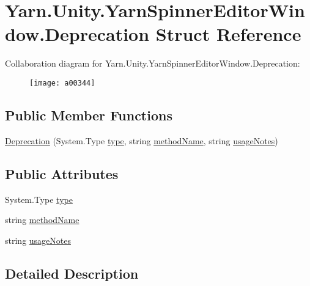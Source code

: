 \hypertarget{a00034}{\section{Yarn.\-Unity.\-Yarn\-Spinner\-Editor\-Window.\-Deprecation Struct Reference}
\label{a00034}
}


Collaboration diagram for Yarn.\-Unity.\-Yarn\-Spinner\-Editor\-Window.\-Deprecation\-:
\nopagebreak
\begin{figure}[H]
\begin{center}
\leavevmode
\texttt{[image: a00344]}
\end{center}
\end{figure}
\subsection*{Public Member Functions}
\begin{DoxyCompactItemize}
\item 
\hyperlink{a00034_ae80171841e97a48611c51a9a574a2fc0}{Deprecation} (System.\-Type \hyperlink{a00034_a750904df254223bf3131c39017f90a0b}{type}, string \hyperlink{a00034_a61605b2d0a17dfdf9c62952270d44fbd}{method\-Name}, string \hyperlink{a00034_ac23509be7ae6b43a3e2154dd430954a7}{usage\-Notes})
\end{DoxyCompactItemize}
\subsection*{Public Attributes}
\begin{DoxyCompactItemize}
\item 
System.\-Type \hyperlink{a00034_a750904df254223bf3131c39017f90a0b}{type}
\item 
string \hyperlink{a00034_a61605b2d0a17dfdf9c62952270d44fbd}{method\-Name}
\item 
string \hyperlink{a00034_ac23509be7ae6b43a3e2154dd430954a7}{usage\-Notes}
\end{DoxyCompactItemize}


\subsection{Detailed Description}


